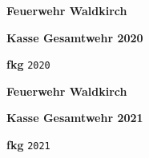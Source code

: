 \documentclass[12pt]{scrartcl}
\begin{document}
\begin{center}
  \large \textbf{Feuerwehr Waldkirch}
  \vspace{\fill}
   \begin{turn}{90}
      \huge{ 
	\textbf{Kasse Gesamtwehr 2020}
      }
   \end{turn}
  \vspace{\fill}
  \textbf{fkg}
  \texttt{2020}
\end{center}

\newpage

\begin{center}
  \large \textbf{Feuerwehr Waldkirch}
  \vspace{\fill}
   \begin{turn}{90}
      \huge{ 
	\textbf{Kasse Gesamtwehr 2021}
      }
   \end{turn}
  \vspace{\fill}
  \textbf{fkg}
  \texttt{2021}

\end{center}

\end{document}
